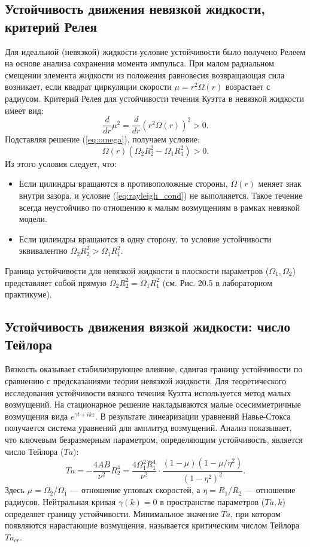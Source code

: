 \documentclass[a4paper,12pt]{article}
\begin{document}
\subsection{Устойчивость движения невязкой жидкости, критерий Релея}
Для идеальной (невязкой) жидкости условие устойчивости было получено Релеем на основе анализа сохранения момента импульса. При малом радиальном смещении элемента жидкости из положения равновесия возвращающая сила возникает, если квадрат циркуляции скорости \(\mu = r^2\Omega(r)\) возрастает с радиусом. Критерий Релея для устойчивости течения Куэтта в невязкой жидкости имеет вид:
\begin{equation}
\frac{d}{dr}\mu^2 = \frac{d}{dr}(r^2\Omega(r))^2 > 0.
\label{eq:rayleigh}
\end{equation}
Подставляя решение (\ref{eq:omega}), получаем условие:
\begin{equation}
\Omega(r)(\Omega_2 R_2^2 - \Omega_1 R_1^2) > 0.
\label{eq:rayleigh_cond}
\end{equation}
Из этого условия следует, что:
\begin{itemize}
    \item Если цилиндры вращаются в противоположные стороны, \(\Omega(r)\) меняет знак внутри зазора, и условие (\ref{eq:rayleigh_cond}) не выполняется. Такое течение всегда неустойчиво по отношению к малым возмущениям в рамках невязкой модели.
    \item Если цилиндры вращаются в одну сторону, то условие устойчивости эквивалентно \(\Omega_2 R_2^2 > \Omega_1 R_1^2\).
\end{itemize}
Граница устойчивости для невязкой жидкости в плоскости параметров (\(\Omega_1, \Omega_2\)) представляет собой прямую \(\Omega_2 R_2^2 = \Omega_1 R_1^2\) (см. Рис. 20.5 в лабораторном практикуме).

\subsection{Устойчивость движения вязкой жидкости: число Тейлора}
Вязкость оказывает стабилизирующее влияние, сдвигая границу устойчивости по сравнению с предсказаниями теории невязкой жидкости. Для теоретического исследования устойчивости вязкого течения Куэтта используется метод малых возмущений. На стационарное решение накладываются малые осесимметричные возмущения вида \(e^{\gamma t + ikz}\). В результате линеаризации уравнений Навье-Стокса получается система уравнений для амплитуд возмущений. Анализ показывает, что ключевым безразмерным параметром, определяющим устойчивость, является число Тейлора (\(Ta\)):
\begin{equation}
Ta = -\frac{4AB}{\nu^2} R_2^4 = \frac{4\Omega_1^2 R_1^4}{\nu^2} \cdot \frac{(1 - \mu)(1 - \mu/\eta^2)}{(1 - \eta^2)^2}.
\label{eq:Taylor}
\end{equation}
Здесь \(\mu = \Omega_2/\Omega_1\) — отношение угловых скоростей, а \(\eta = R_1/R_2\) — отношение радиусов. Нейтральная кривая \(\gamma(k) = 0\) в пространстве параметров (\(Ta, k\)) определяет границу устойчивости. Минимальное значение \(Ta\), при котором появляются нарастающие возмущения, называется критическим числом Тейлора \(Ta_{cr}\).
\end{document}
